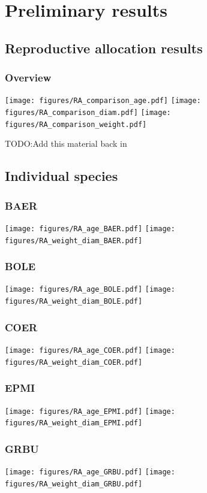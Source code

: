 \documentclass[10pt]{book} %
\begin{document}
\chapter{Preliminary results}
\section{Reproductive allocation results}
\subsection{Overview}
\texttt{[image: figures/RA\_comparison\_age.pdf]}
\texttt{[image: figures/RA\_comparison\_diam.pdf]}
\texttt{[image: figures/RA\_comparison\_weight.pdf]}
\clearpage

TODO:Add this material back in

\newpage
\section{Individual species}
\subsection{BAER}
\texttt{[image: figures/RA\_age\_BAER.pdf]}
\texttt{[image: figures/RA\_weight\_diam\_BAER.pdf]}

\clearpage
\newpage
\subsection{BOLE}
\texttt{[image: figures/RA\_age\_BOLE.pdf]}
\texttt{[image: figures/RA\_weight\_diam\_BOLE.pdf]}

\clearpage
\newpage
\subsection{COER}
\texttt{[image: figures/RA\_age\_COER.pdf]}
\texttt{[image: figures/RA\_weight\_diam\_COER.pdf]}

\clearpage
\newpage
\subsection{EPMI}
\texttt{[image: figures/RA\_age\_EPMI.pdf]}
\texttt{[image: figures/RA\_weight\_diam\_EPMI.pdf]}

\clearpage
\newpage
\subsection{GRBU}
\texttt{[image: figures/RA\_age\_GRBU.pdf]}
\texttt{[image: figures/RA\_weight\_diam\_GRBU.pdf]}
\end{document}
